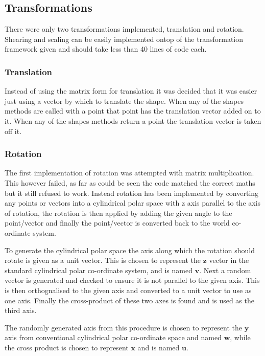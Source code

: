   \subsection{Transformations}
    There were only two transformations implemented, translation and rotation.
    Shearing and scaling can be easily implemented ontop of the transformation
    framework given and should take less than 40 lines of code each.

    \subsubsection{Translation}
      Instead of using the matrix form for translation it was decided that it
      was easier just using a vector by which to translate the shape.  When any
      of the shapes methods are called with a point that point has the
      translation vector added on to it.  When any of the shapes methods return
      a point the translation vector is taken off it.

    \subsubsection{Rotation}
      The first implementation of rotation was attempted with matrix
      multiplication.  This however failed, as far as could be seen the code
      matched the correct maths but it still refused to work.  Instead rotation
      has been implemented by converting any points or vectors into a
      cylindrical polar space with z axis parallel to the axis of rotation, the
      rotation is then applied by adding the given angle to the point/vector and
      finally the point/vector is converted back to the world co-ordinate
      system.

      To generate the cylindrical polar space the axis along which the rotation
      should rotate is given as a unit vector. This is chosen to represent the
      $\mathbf{z}$ vector in the standard cylindrical polar co-ordinate system,
      and is named $\mathbf{v}$.
      Next a random vector is generated and checked to ensure it is not parallel
      to the given axis.  This is then orthognalised to the given axis and
      converted to a unit vector to use as one axis.  Finally the cross-product
      of these two axes is found and is used as the third axis.

      The randomly generated axis from this procedure is chosen to represent the
      $\mathbf{y}$ axis from conventional cylindrical polar co-ordinate space
      and named $\mathbf{w}$, while the cross product is chosen to represent
      $\mathbf{x}$ and is named $\mathbf{u}$.

